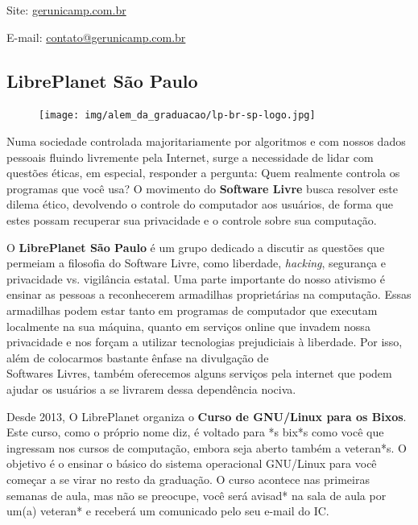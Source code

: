 \begin{compactitemize}
    \item  Site: \url{gerunicamp.com.br}
    \item  E-mail: \url{contato@gerunicamp.com.br}
\end{compactitemize}

\subsection{LibrePlanet São Paulo}

\begin{figure}[h!]
    \centering
    \texttt{[image: img/alem\_da\_graduacao/lp-br-sp-logo.jpg]}
\end{figure}

Numa sociedade controlada majoritariamente por algoritmos e com nossos dados
pessoais fluindo livremente pela Internet, surge a necessidade de lidar com
questões éticas, em especial, responder a pergunta: Quem realmente controla os
programas que você usa?  O movimento do {\bf Software Livre} busca resolver este
dilema ético, devolvendo o controle do computador aos usuários, de forma que
estes possam recuperar sua privacidade e o controle sobre sua computação.

O {\bf LibrePlanet São Paulo} é um grupo dedicado a discutir as questões que
permeiam a filosofia do Software Livre, como liberdade, \emph{hacking},
segurança e privacidade vs. vigilância estatal.  Uma parte importante do nosso
ativismo é ensinar as pessoas a reconhecerem armadilhas proprietárias na
computação. Essas armadilhas podem estar tanto em programas de computador que
executam localmente na sua máquina, quanto em serviços online que invadem nossa
privacidade e nos forçam a utilizar tecnologias prejudiciais à liberdade.  Por
isso, além de colocarmos bastante ênfase na divulgação de\\Softwares Livres,
também oferecemos alguns serviços pela internet que podem ajudar os usuários a
se livrarem dessa dependência nociva.

Desde 2013, O LibrePlanet organiza o {\bf Curso de GNU/Linux para os Bixos}.
Este curso, como o próprio nome diz, é voltado para *s bix*s como você que
ingressam nos cursos de computação, embora seja aberto também a veteran*s. O
objetivo é o ensinar o básico do sistema operacional GNU/Linux para você começar
a se virar no resto da graduação.  O curso acontece nas primeiras semanas de
aula, mas não se preocupe, você será avisad* na sala de aula por um(a) veteran* e
receberá um comunicado pelo seu e-mail do IC.

